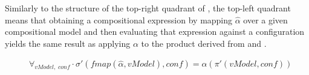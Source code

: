 Similarly to the structure of the top-right quadrant of , the top-left quadrant means that obtaining a compositional expression by mapping $\hat{\alpha}$ over a given compositional model  and then evaluating that expression against a configuration  yields the same result as applying $\alpha$ to the product derived from  and . 
\begin{theorem}
\begin{equation*}
\begin{split}
& \forall_{\mathit{vModel}, \; \mathit{conf}} \cdot \mathit{\sigma'(\text{fmap}(\hat\alpha,vModel),conf)} = \mathit{\alpha(\pi'(vModel,conf))}
\end{split}
\end{equation*}
\end{theorem}
